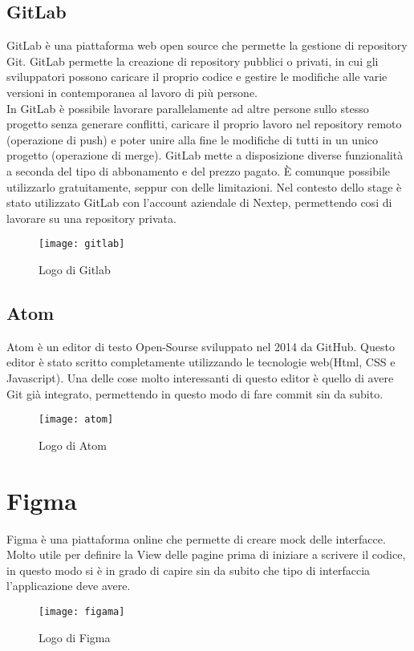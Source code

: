 \subsection{GitLab}GitLab è una piattaforma web open source che permette la gestione di repository Git. GitLab permette la creazione di repository pubblici o privati, in cui gli sviluppatori possono caricare il proprio codice e gestire le modifiche alle varie versioni in contemporanea al lavoro di più persone. 
\\

In GitLab è possibile lavorare parallelamente ad altre persone sullo stesso progetto senza generare conflitti, caricare il proprio lavoro nel repository remoto (operazione di push) e poter unire alla fine le modifiche di tutti in un unico progetto (operazione di merge). GitLab mette a disposizione diverse funzionalità a seconda del tipo di abbonamento e del prezzo pagato. È comunque possibile utilizzarlo gratuitamente, seppur con delle limitazioni. Nel contesto dello stage è stato utilizzato GitLab con l'account aziendale di Nextep, permettendo cosi di lavorare su una repository privata. 
\begin{figure}[!h] 
	\centering 
	\texttt{[image: gitlab]}
	\caption{Logo di Gitlab}
\end{figure}
\subsection{Atom}
Atom è un editor di testo Open-Sourse sviluppato nel 2014 da GitHub. Questo editor è stato scritto completamente utilizzando le tecnologie web(Html, CSS e Javascript). 
Una delle cose molto interessanti di questo editor è quello di avere Git già integrato, permettendo in questo modo di fare commit sin da subito. 
\begin{figure}[!h] 
	\centering 
	\texttt{[image: atom]}
	\caption{Logo di Atom}
\end{figure}
 \section{Figma} Figma è una piattaforma online che permette di creare mock delle interfacce. Molto utile per definire la View delle pagine prima di iniziare a scrivere il codice, in questo modo si è in grado di capire sin da subito che tipo di interfaccia l'applicazione deve avere.
 \begin{figure}[!h] 
 	\centering 
 	\texttt{[image: figama]}
 	\caption{Logo di Figma}
 \end{figure}
